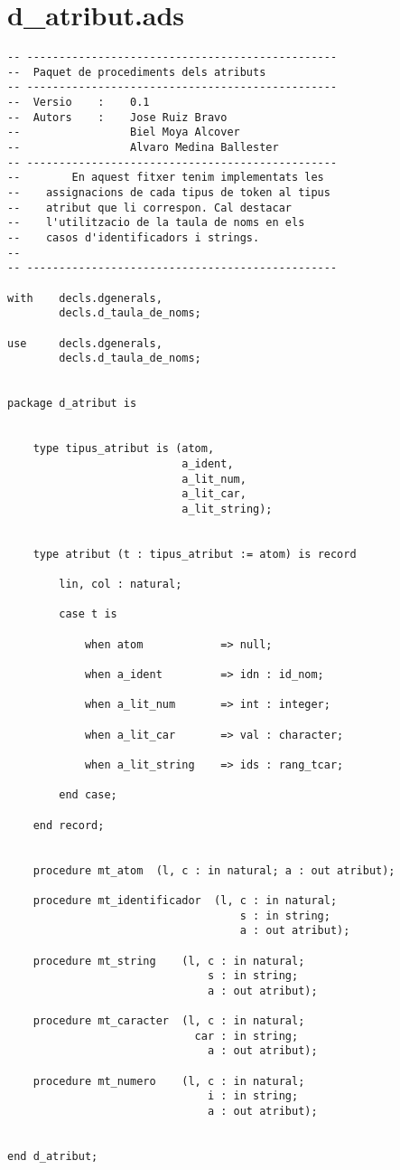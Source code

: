 \documentclass[10pt]{report}
\begin{document}
    \section{d\_atribut.ads}
    \begin{lstlisting}[style=Ada]
-- ------------------------------------------------
--  Paquet de procediments dels atributs
-- ------------------------------------------------
--  Versio    :    0.1
--  Autors    :    Jose Ruiz Bravo
--                 Biel Moya Alcover
--                 Alvaro Medina Ballester
-- ------------------------------------------------
--        En aquest fitxer tenim implementats les 
--    assignacions de cada tipus de token al tipus
--    atribut que li correspon. Cal destacar 
--    l'utilitzacio de la taula de noms en els
--    casos d'identificadors i strings.
--
-- ------------------------------------------------

with    decls.dgenerals,
        decls.d_taula_de_noms;
        
use     decls.dgenerals,
        decls.d_taula_de_noms;


package d_atribut is


    type tipus_atribut is (atom,
                           a_ident,
                           a_lit_num,
                           a_lit_car,
                           a_lit_string);
                            
                            
    type atribut (t : tipus_atribut := atom) is record
        
        lin, col : natural;
        
        case t is
        
            when atom            => null;
            
            when a_ident         => idn : id_nom;
            
            when a_lit_num       => int : integer;
            
            when a_lit_car       => val : character;    
            
            when a_lit_string    => ids : rang_tcar;
            
        end case;
                
    end record;
    
    
    procedure mt_atom  (l, c : in natural; a : out atribut);
    
    procedure mt_identificador  (l, c : in natural; 
                                    s : in string; 
                                    a : out atribut);
    
    procedure mt_string    (l, c : in natural; 
                               s : in string; 
                               a : out atribut);
    
    procedure mt_caracter  (l, c : in natural; 
                             car : in string; 
                               a : out atribut);
    
    procedure mt_numero    (l, c : in natural; 
                               i : in string; 
                               a : out atribut);
        
    
end d_atribut;
    \end{lstlisting}
\end{document}
